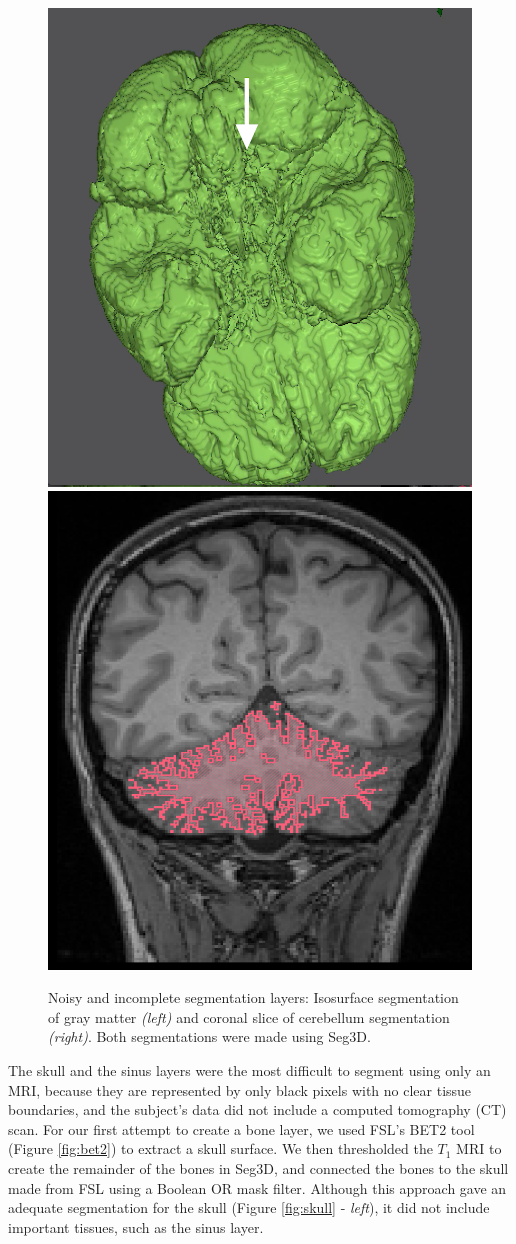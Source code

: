 \begin{figure}[H]
\begin{center}
\includegraphics[width=.49\textwidth]{Figures/badseg_1}
\includegraphics[width=.49\textwidth]{Figures/badseg_2}
\caption{Noisy and incomplete segmentation layers: Isosurface segmentation of gray matter \textit{(left)} and coronal slice of cerebellum segmentation \textit{(right)}. Both segmentations were made using Seg3D.}
\label{fig:badseg}
\end{center}
\end{figure}

The skull and the sinus layers were the most difficult to segment using only an MRI, because they are represented by only black pixels with no clear tissue boundaries, and the subject's data did not include a computed tomography (CT) scan. For our first attempt to create a bone layer, we used FSL's BET2 tool (Figure \ref{fig:bet2}) to extract a skull surface. We then thresholded the $T_1$ MRI to create the remainder of the bones in Seg3D, and connected the bones to the skull made from FSL using a Boolean OR mask filter. Although this approach gave an adequate segmentation for the skull (Figure \ref{fig:skull} - \textit{left}), it did not include important tissues, such as the sinus layer. 


